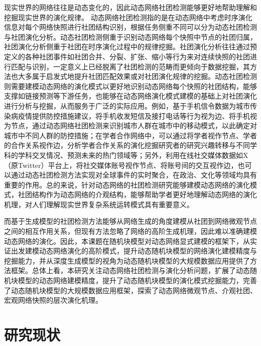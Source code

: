 现实世界的网络往往是动态变化的，因此动态网络社团检测能够更好地帮助理解和挖掘现实世界的演化规律。
动态网络社团检测指的是在动态网络中考虑时序演化信息对每个网络快照进行社团结构识别，根据任务侧重不同可以分为动态社团检测与社团演化分析。动态社团检测侧重于识别动态网络每个快照中节点的社团归属，社团演化分析侧重于社团在时序演化过程中的规律挖掘。社团演化分析往往通过预定义的各种社团事件如社团合并、分裂、扩张、缩小等行为\cite{palla2007quantifying}来对连续快照的社团进行匹配与识别，一定意义上已经脱离了社团检测的范畴而更倾向于数据挖掘，其方法也大多属于启发式地提升社团匹配效果或对社团演化规律的挖掘。动态社团检测则需要建模动态网络的演化模式以更好地识别动态网络每个快照的社团结构，能够支撑如链接预测等下游任务，也能够在动态网络演化模式建模的基础上对社团演化进行分析与挖掘，从而服务于广泛的实际应用\cite{farajtabar2017coevolve,kumar2024community}。例如，基于手机信令数据为城市传染病疫情提供防控措施建议\cite{he2024urban}，将手机收发短信及接打电话等行为视为边、将手机视为节点，通过动态网络社团检测来识别城市人群在城市中的移动模式，以此确定对城市中不同人群的防控措施；在学者合作网络中，可以通过将学者视作节点、学者的合作关系视作边，分析学者合作关系的演化挖掘研究者的研究兴趣转移与不同学科的学科交叉情况、预测未来的热门领域等\cite{wu2019large,wang2022weak}；另外，利用在线社交媒体数据如X（原Twitter）平台上，将社交媒体账号视作节点、将账号间的交互视作边，也可以通过动态社团检测方法实现对全球事件的实时聚合，在政治、文化等领域均具有重要的作用\cite{ma2024knowledge}。总的来说，针对动态网络的社团检测研究能够建模动态网络的演化模式，社团结构作为动态网络的介观结构，能够帮助学者更好地理解动态网络的演化机理，对人们理解现实世界复杂系统运转模式具有重要意义。

而基于生成模型的社团检测方法能够从网络生成的角度建模从社团到网络微观节点之间的相互作用关系，但现有方法忽略了网络的高阶生成机理，因此难以准确建模动态网络的演化。因此，本课题在随机块模型对动态网络显式建模的框架下，从实证出发建模动态网络演化的高阶模式，提升动态随机块模型的网络演化建模精度与挖掘能力，并从深度生成模型的视角为动态随机块模型的大规模数据应用提供了方法框架。总体上看，本研究关注动态网络社团检测与演化分析问题，扩展了动态随机块模型的动态网络建模精度，提升了动态随机块模型的演化模式挖掘能力，完善了动态随机块模型的大规模数据应用框架，探索了动态网络微观节点、介观社团、宏观网络快照的层次演化机理。





\section{研究现状}

